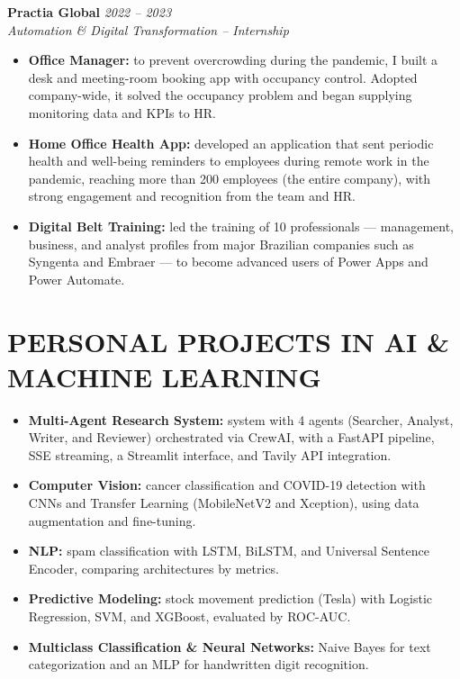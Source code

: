 \documentclass[11pt,a4paper]{article}
\begin{document}
\noindent
\textbf{Practia Global} \hfill \textit{2022 -- 2023} \\
\textit{Automation \& Digital Transformation -- Internship}
\begin{itemize}
    \item \textbf{Office Manager:} to prevent overcrowding during the pandemic, I built a desk and meeting-room booking app with occupancy control. Adopted company-wide, it solved the occupancy problem and began supplying monitoring data and KPIs to HR.
    \item \textbf{Home Office Health App:} developed an application that sent periodic health and well-being reminders to employees during remote work in the pandemic, reaching more than 200 employees (the entire company), with strong engagement and recognition from the team and HR.
    \item \textbf{Digital Belt Training:} led the training of 10 professionals --- management, business, and analyst profiles from major Brazilian companies such as Syngenta and Embraer --- to become advanced users of Power Apps and Power Automate.
\end{itemize}

\section{PERSONAL PROJECTS IN AI \& MACHINE LEARNING}
\begin{itemize}
    \item \textbf{Multi-Agent Research System:} system with 4 agents (Searcher, Analyst, Writer, and Reviewer) orchestrated via CrewAI, with a FastAPI pipeline, SSE streaming, a Streamlit interface, and Tavily API integration.
    \item \textbf{Computer Vision:} cancer classification and COVID-19 detection with CNNs and Transfer Learning (MobileNetV2 and Xception), using data augmentation and fine-tuning.
    \item \textbf{NLP:} spam classification with LSTM, BiLSTM, and Universal Sentence Encoder, comparing architectures by metrics.
    \item \textbf{Predictive Modeling:} stock movement prediction (Tesla) with Logistic Regression, SVM, and XGBoost, evaluated by ROC-AUC.
    \item \textbf{Multiclass Classification \& Neural Networks:} Naive Bayes for text categorization and an MLP for handwritten digit recognition.
\end{itemize}
\end{document}
